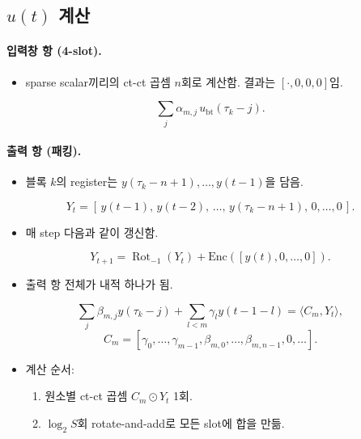 \documentclass[11pt,a4paper]{article}
\newcommand{\Rot}{\operatorname{Rot}}
\begin{document}
\subsection{$u(t)$ 계산}
\paragraph{입력창 항 (4-slot).}
\begin{itemize}
\item sparse scalar끼리의 ct-ct 곱셈 $n$회로 계산함. 결과는 $[\cdot,0,0,0]$임.
\end{itemize}
\begin{equation}
\sum_j\alpha_{m,j}\,u_{\mathrm{bt}}(\tau_k-j).
\end{equation}

\paragraph{출력 항 (패킹).}
\begin{itemize}
\item 블록 $k$의 register는 $y(\tau_k-n+1),\dots,y(t-1)$을 담음.
\end{itemize}
\begin{equation}
Y_t=[\,y(t-1),\,y(t-2),\,\dots,\,y(\tau_k-n+1),\,0,\dots,0\,].
\end{equation}
\begin{itemize}
\item 매 step 다음과 같이 갱신함.
\end{itemize}
\begin{equation}
Y_{t+1}=\Rot_{-1}(Y_t)+\mathrm{Enc}([y(t),0,\dots,0]).
\end{equation}
\begin{itemize}
\item 출력 항 전체가 내적 하나가 됨.
\end{itemize}
\begin{equation}
\sum_{j}\beta_{m,j}y(\tau_k-j)+\sum_{l<m}\gamma_l y(t-1-l)=\langle C_m,Y_t\rangle,
\end{equation}
\begin{equation}
C_m=[\gamma_0,\dots,\gamma_{m-1},\beta_{m,0},\dots,\beta_{m,n-1},0,\dots].
\end{equation}
\begin{itemize}
\item 계산 순서:
  \begin{enumerate}
  \item 원소별 ct-ct 곱셈 $C_m\odot Y_t$ 1회.
  \item $\log_2S$회 rotate-and-add로 모든 slot에 합을 만듦.
  \end{enumerate}
\end{itemize}
\end{document}
